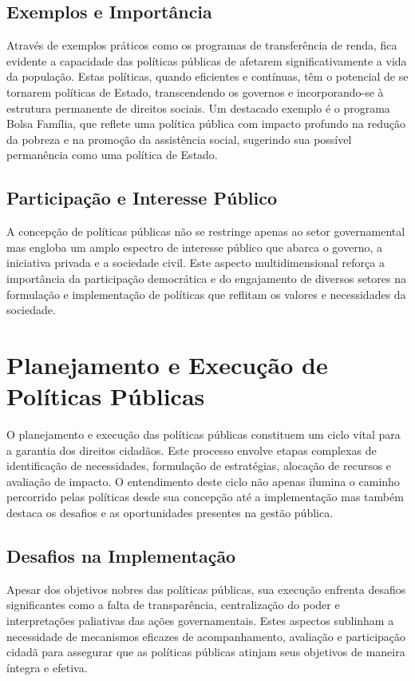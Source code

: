\documentclass[
   article,       
   12pt,          
   oneside,       
   a4paper,       
   english,       
   brazil,        
   sumario=tradicional
   ]{abntex2}
\begin{document}
\subsection{Exemplos e Importância}
Através de exemplos práticos como os programas de transferência de renda, fica evidente a capacidade das políticas públicas de afetarem significativamente a vida da população. Estas políticas, quando eficientes e contínuas, têm o potencial de se tornarem políticas de Estado, transcendendo os governos e incorporando-se à estrutura permanente de direitos sociais. Um destacado exemplo é o programa Bolsa Família, que reflete uma política pública com impacto profundo na redução da pobreza e na promoção da assistência social, sugerindo sua possível permanência como uma política de Estado.

\subsection{Participação e Interesse Público}
A concepção de políticas públicas não se restringe apenas ao setor governamental mas engloba um amplo espectro de interesse público que abarca o governo, a iniciativa privada e a sociedade civil. Este aspecto multidimensional reforça a importância da participação democrática e do engajamento de diversos setores na formulação e implementação de políticas que reflitam os valores e necessidades da sociedade.

\section{Planejamento e Execução de Políticas Públicas}
O planejamento e execução das políticas públicas constituem um ciclo vital para a garantia dos direitos cidadãos. Este processo envolve etapas complexas de identificação de necessidades, formulação de estratégias, alocação de recursos e avaliação de impacto. O entendimento deste ciclo não apenas ilumina o caminho percorrido pelas políticas desde sua concepção até a implementação mas também destaca os desafios e as oportunidades presentes na gestão pública.

\subsection{Desafios na Implementação}
Apesar dos objetivos nobres das políticas públicas, sua execução enfrenta desafios significantes como a falta de transparência, centralização do poder e interpretações paliativas das ações governamentais. Estes aspectos sublinham a necessidade de mecanismos eficazes de acompanhamento, avaliação e participação cidadã para assegurar que as políticas públicas atinjam seus objetivos de maneira íntegra e efetiva.
\end{document}
